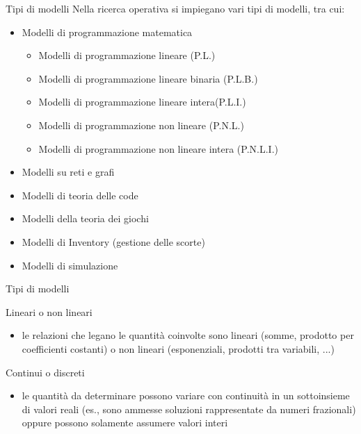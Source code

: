 \documentclass{beamer}
\begin{document}
\begin{frame}{Tipi di modelli}
 Nella ricerca operativa si impiegano vari tipi di modelli, tra cui:
 \begin{itemize}
   \item  Modelli di programmazione matematica
   \begin{itemize}
      \item Modelli di programmazione lineare (P.L.)
      \item Modelli di programmazione lineare binaria (P.L.B.)
      \item Modelli di programmazione lineare intera(P.L.I.)
      \item Modelli di programmazione non lineare (P.N.L.)
      \item Modelli di programmazione non lineare intera (P.N.L.I.)
    \end{itemize}
    \item  Modelli su reti e grafi 
    \item  Modelli di teoria delle code
    \item  Modelli della teoria dei giochi
    \item  Modelli di Inventory (gestione delle scorte)
    \item  Modelli di simulazione
  \end{itemize}
 \end{frame}

\begin{frame}{Tipi di modelli}
    \begin{block}{Lineari o non lineari}
    \begin{itemize}
     \item {le relazioni che legano le quantit\`a coinvolte sono lineari
     (somme, prodotto per coefficienti costanti) o non lineari
     (esponenziali, prodotti tra variabili, ...)}
    \end{itemize}
    \end{block}

    \begin{block}{Continui o discreti}
    \begin{itemize}
     \item {le quantit\`a da determinare possono variare con continuit\`a
     in un sottoinsieme di valori reali}
     (es., sono ammesse soluzioni rappresentate da numeri frazionali)
     oppure possono solamente assumere valori interi
    \end{itemize}
  \end{block}
\end{frame}
\end{document}
